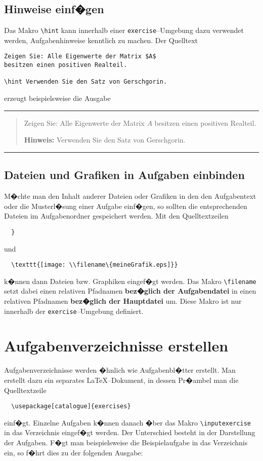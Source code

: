 \subsection{Hinweise einf�gen}
Das Makro \verb|\hint| kann innerhalb einer \verb|exercise|--Umgebung dazu verwendet werden, Aufgabenhinweise kenntlich zu machen. Der Quelltext
\begin{verbatim}
Zeigen Sie: Alle Eigenwerte der Matrix $A$ 
besitzen einen positiven Realteil.

\hint Verwenden Sie den Satz von Gerschgorin.
\end{verbatim}
erzeugt beispielsweise die Ausgabe
\vspace*{2em}
\hrule
\begin{quote}
Zeigen Sie: Alle Eigenwerte der Matrix $A$ besitzen einen positiven Realteil.

\par\medskip\noindent\textbf{Hinweis:}\hspace{1em} Verwenden Sie den Satz von Gerschgorin.
\end{quote}
\hrule
\vspace*{2em}


\subsection{Dateien und Grafiken in Aufgaben einbinden}
M�chte man den Inhalt anderer Dateien oder Grafiken in den den Aufgabentext oder die Musterl�sung einer Aufgabe einf�gen, so sollten die entsprechenden Dateien im Aufgabenordner gespeichert werden. Mit den Quelltextzeilen
\begin{verbatim}
  }
\end{verbatim}
und
\begin{verbatim}
  \texttt{[image: \\filename\{meineGrafik.eps]}}
\end{verbatim}
k�nnen dann Dateien bzw. Graphiken eingef�gt werden. Das Makro \verb|\filename| setzt dabei einen relativen Pfadnamen \textbf{bez�glich der Aufgabendatei} in einen relativen Pfadnamen \textbf{bez�glich der Hauptdatei} um. Diese Makro ist nur innerhalb der \verb|exercise|--Umgebung definiert.



\section{Aufgabenverzeichnisse erstellen}

Aufgabenverzeichnisse werden �hnlich wie Aufgabenbl�tter erstellt. Man erstellt dazu ein separates \LaTeX--Dokument, in dessen Pr�ambel man die Quelltextzeile
\begin{verbatim}
  \usepackage[catalogue]{exercises}
\end{verbatim}
einf�gt. Einzelne Aufgaben k�nnen danach �ber das Makro \verb|\inputexercise| in das Verzeichnis eingef�gt werden. Der Unterschied besteht in der Darstellung der Aufgaben. F�gt man beispielsweise die Beispielaufgabe in das Verzeichnis ein, so f�hrt dies zu der folgenden Ausgabe:

